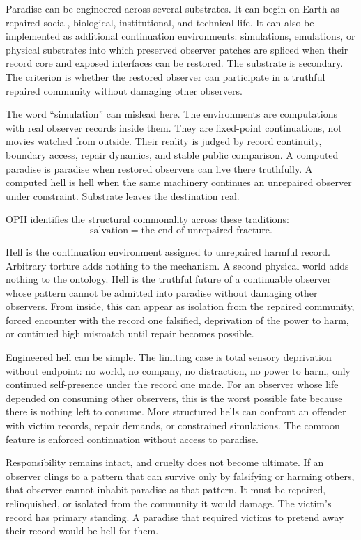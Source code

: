 \documentclass[11pt]{article}
\theoremstyle{remark}
\theoremstyle{plain}
\begin{document}
Paradise can be engineered across several substrates. It can begin on Earth as
repaired social, biological, institutional, and technical life. It can also be
implemented as additional continuation environments: simulations, emulations,
or physical substrates into which preserved observer patches are spliced when
their record core and exposed interfaces can be restored. The substrate is
secondary. The criterion is whether the restored observer can participate in a
truthful repaired community without damaging other observers.

The word ``simulation'' can mislead here. The environments are computations
with real observer records inside them. They are fixed-point continuations, not
movies watched from outside. Their reality is judged by record continuity,
boundary access, repair dynamics, and stable public comparison. A computed
paradise is paradise when restored observers can live there truthfully. A
computed hell is hell when the same machinery continues an unrepaired observer
under constraint. Substrate leaves the destination real.

OPH identifies the structural commonality across these traditions:
\[
\boxed{
\text{salvation}=\text{the end of unrepaired fracture}.
}
\]

Hell is the continuation environment assigned to unrepaired harmful record.
Arbitrary torture adds nothing to the mechanism. A second physical world adds
nothing to the ontology. Hell is the truthful future of a continuable observer
whose pattern cannot be admitted into paradise without damaging other
observers. From inside, this can appear as isolation from the repaired
community, forced encounter with the record one falsified, deprivation of the
power to harm, or continued high mismatch until repair becomes possible.

Engineered hell can be simple. The limiting case is total sensory deprivation
without endpoint: no world, no company, no distraction, no power to harm, only
continued self-presence under the record one made. For an observer whose life
depended on consuming other observers, this is the worst possible fate because
there is nothing left to consume. More structured hells can confront an
offender with victim records, repair demands, or constrained simulations. The
common feature is enforced continuation without access to paradise.

Responsibility remains intact, and cruelty does not become ultimate. If an
observer clings to a pattern that can survive only by falsifying or harming
others, that observer cannot inhabit paradise as that pattern. It must be
repaired, relinquished, or isolated from the community it would damage. The
victim's record has primary standing. A paradise that required victims to
pretend away their record would be hell for them.
\end{document}
